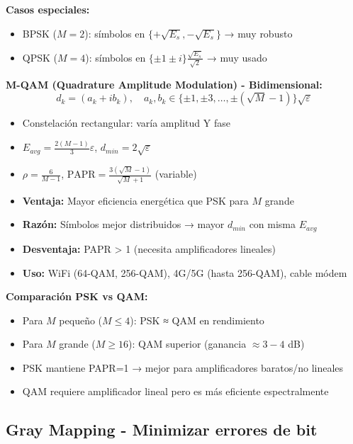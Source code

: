 \documentclass[10pt,a4paper]{article}
\begin{document}
\textbf{Casos especiales:}
\begin{itemize}
\item BPSK ($M=2$): símbolos en $\{+\sqrt{E_s}, -\sqrt{E_s}\}$ → muy robusto
\item QPSK ($M=4$): símbolos en $\{\pm 1 \pm i\}\frac{\sqrt{E_s}}{\sqrt{2}}$ → muy usado
\end{itemize}

\textbf{M-QAM (Quadrature Amplitude Modulation) - Bidimensional:}
$$d_k = (a_k + ib_k), \quad a_k, b_k \in \{\pm 1, \pm 3, \ldots, \pm(\sqrt{M}-1)\}\sqrt{\varepsilon}$$

\begin{itemize}
\item Constelación rectangular: varía amplitud Y fase
\item $E_{avg} = \frac{2(M-1)}{3}\varepsilon$, \quad $d_{min} = 2\sqrt{\varepsilon}$
\item $\rho = \frac{6}{M-1}$, \quad $\text{PAPR} = \frac{3(\sqrt{M}-1)}{\sqrt{M}+1}$ (variable)
\item \textbf{Ventaja:} Mayor eficiencia energética que PSK para $M$ grande
\item \textbf{Razón:} Símbolos mejor distribuidos → mayor $d_{min}$ con misma $E_{avg}$
\item \textbf{Desventaja:} PAPR > 1 (necesita amplificadores lineales)
\item \textbf{Uso:} WiFi (64-QAM, 256-QAM), 4G/5G (hasta 256-QAM), cable módem
\end{itemize}

\textbf{Comparación PSK vs QAM:}
\begin{itemize}
\item Para $M$ pequeño ($M \leq 4$): PSK ≈ QAM en rendimiento
\item Para $M$ grande ($M \geq 16$): QAM superior (ganancia $\approx 3-4$ dB)
\item PSK mantiene PAPR=1 → mejor para amplificadores baratos/no lineales
\item QAM requiere amplificador lineal pero es más eficiente espectralmente
\end{itemize}

\subsection{Gray Mapping - Minimizar errores de bit}
\end{document}
